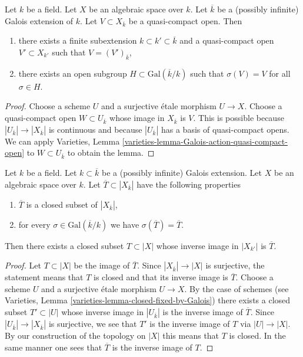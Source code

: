 \begin{lemma}
\label{lemma-Galois-action-quasi-compact-open}
Let $k$ be a field. Let $X$ be an algebraic space over $k$.
Let $\overline{k}$ be a (possibly infinite) Galois extension of $k$.
Let $V \subset X_{\overline{k}}$ be a quasi-compact open.
Then
\begin{enumerate}
\item there exists a finite subextension $k \subset k' \subset \overline{k}$
and a quasi-compact open $V' \subset X_{k'}$ such that
$V = (V')_{\overline{k}}$,
\item there exists an open subgroup $H \subset \text{Gal}(\overline{k}/k)$
such that $\sigma(V) = V$ for all $\sigma \in H$.
\end{enumerate}
\end{lemma}

\begin{proof}
Choose a scheme $U$ and a surjective \'etale morphism $U \to X$.
Choose a quasi-compact open $W \subset U_{\overline{k}}$ whose
image in $X_{\overline{k}}$ is $V$. This is possible because
$|U_{\overline{k}}| \to |X_{\overline{k}}|$ is continuous and because
$|U_{\overline{k}}|$ has a basis of quasi-compact opens. We can apply
Varieties, Lemma
\ref{varieties-lemma-Galois-action-quasi-compact-open}
to $W \subset U_{\overline{k}}$ to obtain the lemma.
\end{proof}

\begin{lemma}
\label{lemma-closed-fixed-by-Galois}
Let $k$ be a field. Let $k \subset \overline{k}$ be a (possibly infinite)
Galois extension. Let $X$ be an algebraic space over $k$. Let
$\overline{T} \subset |X_{\overline{k}}|$ have the following properties
\begin{enumerate}
\item $\overline{T}$ is a closed subset of $|X_{\overline{k}}|$,
\item for every $\sigma \in \text{Gal}(\overline{k}/k)$
we have $\sigma(\overline{T}) = \overline{T}$.
\end{enumerate}
Then there exists a closed subset $T \subset |X|$ whose inverse image
in $|X_{k'}|$ is $\overline{T}$.
\end{lemma}

\begin{proof}
Let $T \subset |X|$ be the image of $\overline{T}$.
Since $|X_{\overline{k}}| \to |X|$ is surjective, the statement means
that $T$ is closed and that its inverse image is $\overline{T}$.
Choose a scheme $U$ and a surjective \'etale morphism $U \to X$.
By the case of schemes
(see Varieties, Lemma \ref{varieties-lemma-closed-fixed-by-Galois})
there exists a closed subset $T' \subset |U|$ whose inverse image
in $|U_{\overline{k}}|$ is the inverse image of $\overline{T}$.
Since $|U_{\overline{k}}| \to |X_{\overline{k}}|$ is surjective,
we see that $T'$ is the inverse image of $T$ via $|U| \to |X|$.
By our construction of the topology on $|X|$ this means that $T$ is
closed. In the same manner one sees that $\overline{T}$ is the inverse
image of $T$.
\end{proof}

